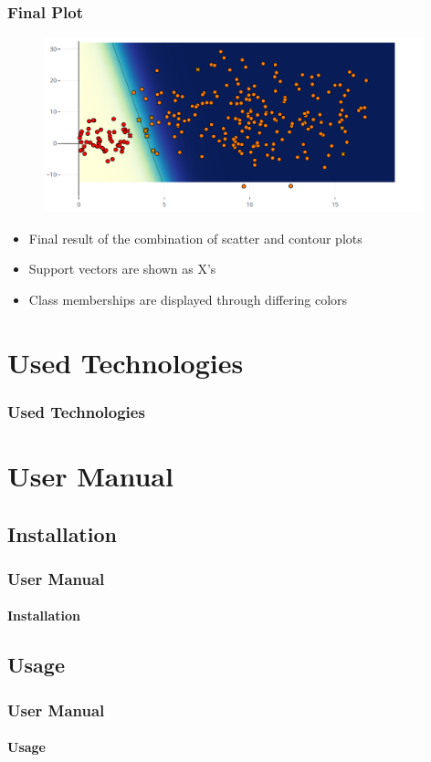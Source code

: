 \documentclass[english,hangout]{beamer}
\begin{document}
\begin{frame}
	\frametitle{Final Plot}
	\begin{figure}
		\centering
		\includegraphics[width=11cm]{FinalPlot.png}
	\end{figure}
	\begin{itemize}
		\item Final result of the combination of scatter and contour plots
		\item Support vectors are shown as X's
		\item Class memberships are displayed through differing colors
	\end{itemize}
\end{frame}

\section{Used Technologies}
\begin{frame}
	\frametitle{Used Technologies}
	
\end{frame}

\section{User Manual}

\subsection{Installation}
\begin{frame}
	\frametitle{User Manual}
	\framesubtitle{Installation}
	
\end{frame}

\subsection{Usage}
\begin{frame}
	\frametitle{User Manual}
	\framesubtitle{Usage}
	
\end{frame}
\end{document}
